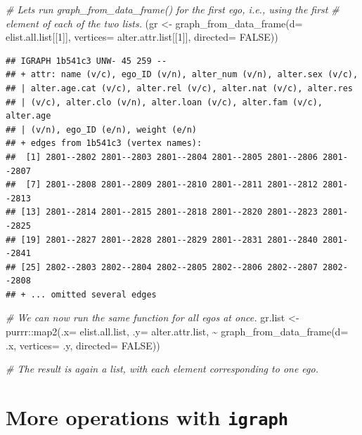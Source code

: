 \documentclass[
]{book}
\newenvironment{Shaded}{\begin{snugshade}}{\end{snugshade}}
\newcommand{\AttributeTok}[1]{\textcolor[rgb]{0.77,0.63,0.00}{#1}}
\newcommand{\CommentTok}[1]{\textcolor[rgb]{0.56,0.35,0.01}{\textit{#1}}}
\newcommand{\ConstantTok}[1]{\textcolor[rgb]{0.00,0.00,0.00}{#1}}
\newcommand{\DecValTok}[1]{\textcolor[rgb]{0.00,0.00,0.81}{#1}}
\newcommand{\FunctionTok}[1]{\textcolor[rgb]{0.00,0.00,0.00}{#1}}
\newcommand{\NormalTok}[1]{#1}
\newcommand{\OtherTok}[1]{\textcolor[rgb]{0.56,0.35,0.01}{#1}}
\newcommand{\SpecialCharTok}[1]{\textcolor[rgb]{0.00,0.00,0.00}{#1}}
\begin{document}
\begin{Shaded}
\begin{Highlighting}[]
\CommentTok{\# Let\textquotesingle{}s run graph\_from\_data\_frame() for the first ego, i.e., using the first}
\CommentTok{\# element of each of the two lists.}
\NormalTok{(gr }\OtherTok{\textless{}{-}} \FunctionTok{graph\_from\_data\_frame}\NormalTok{(}\AttributeTok{d=}\NormalTok{ elist.all.list[[}\DecValTok{1}\NormalTok{]], }
                             \AttributeTok{vertices=}\NormalTok{ alter.attr.list[[}\DecValTok{1}\NormalTok{]], }\AttributeTok{directed=} \ConstantTok{FALSE}\NormalTok{))}
\end{Highlighting}
\end{Shaded}

\begin{verbatim}
## IGRAPH 1b541c3 UNW- 45 259 -- 
## + attr: name (v/c), ego_ID (v/n), alter_num (v/n), alter.sex (v/c),
## | alter.age.cat (v/c), alter.rel (v/c), alter.nat (v/c), alter.res
## | (v/c), alter.clo (v/n), alter.loan (v/c), alter.fam (v/c), alter.age
## | (v/n), ego_ID (e/n), weight (e/n)
## + edges from 1b541c3 (vertex names):
##  [1] 2801--2802 2801--2803 2801--2804 2801--2805 2801--2806 2801--2807
##  [7] 2801--2808 2801--2809 2801--2810 2801--2811 2801--2812 2801--2813
## [13] 2801--2814 2801--2815 2801--2818 2801--2820 2801--2823 2801--2825
## [19] 2801--2827 2801--2828 2801--2829 2801--2831 2801--2840 2801--2841
## [25] 2802--2803 2802--2804 2802--2805 2802--2806 2802--2807 2802--2808
## + ... omitted several edges
\end{verbatim}

\begin{Shaded}
\begin{Highlighting}[]
\CommentTok{\# We can now run the same function for all egos at once.}
\NormalTok{gr.list }\OtherTok{\textless{}{-}}\NormalTok{ purrr}\SpecialCharTok{::}\FunctionTok{map2}\NormalTok{(}\AttributeTok{.x=}\NormalTok{ elist.all.list, }\AttributeTok{.y=}\NormalTok{ alter.attr.list, }
                       \SpecialCharTok{\textasciitilde{}} \FunctionTok{graph\_from\_data\_frame}\NormalTok{(}\AttributeTok{d=}\NormalTok{ .x, }\AttributeTok{vertices=}\NormalTok{ .y, }\AttributeTok{directed=} \ConstantTok{FALSE}\NormalTok{))}

\CommentTok{\# The result is again a list, with each element corresponding to one ego.}
\end{Highlighting}
\end{Shaded}

\hypertarget{more-igraph}{%
\section{\texorpdfstring{More operations with \texttt{igraph}}{More operations with igraph}}\label{more-igraph}}
\end{document}
